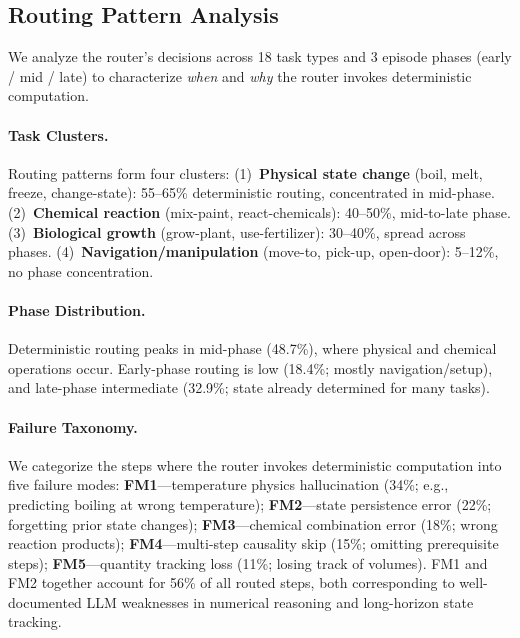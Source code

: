 \documentclass[11pt,a4paper]{article}
\begin{document}
\subsection{Routing Pattern Analysis}

We analyze the router's decisions across 18 task types and 3 episode phases (early / mid / late) to characterize \emph{when} and \emph{why} the router invokes deterministic computation.

\paragraph{Task Clusters.}
Routing patterns form four clusters:
(1)~\textbf{Physical state change} (boil, melt, freeze, change-state): 55--65\% deterministic routing, concentrated in mid-phase.
(2)~\textbf{Chemical reaction} (mix-paint, react-chemicals): 40--50\%, mid-to-late phase.
(3)~\textbf{Biological growth} (grow-plant, use-fertilizer): 30--40\%, spread across phases.
(4)~\textbf{Navigation/manipulation} (move-to, pick-up, open-door): 5--12\%, no phase concentration.

\paragraph{Phase Distribution.}
Deterministic routing peaks in mid-phase (48.7\%), where physical and chemical operations occur.
Early-phase routing is low (18.4\%; mostly navigation/setup), and late-phase intermediate (32.9\%; state already determined for many tasks).

\paragraph{Failure Taxonomy.}
We categorize the steps where the router invokes deterministic computation into five failure modes:
\textbf{FM1}---temperature physics hallucination (34\%; e.g., predicting boiling at wrong temperature);
\textbf{FM2}---state persistence error (22\%; forgetting prior state changes);
\textbf{FM3}---chemical combination error (18\%; wrong reaction products);
\textbf{FM4}---multi-step causality skip (15\%; omitting prerequisite steps);
\textbf{FM5}---quantity tracking loss (11\%; losing track of volumes).
FM1 and FM2 together account for 56\% of all routed steps, both corresponding to well-documented LLM weaknesses in numerical reasoning and long-horizon state tracking.
\end{document}
